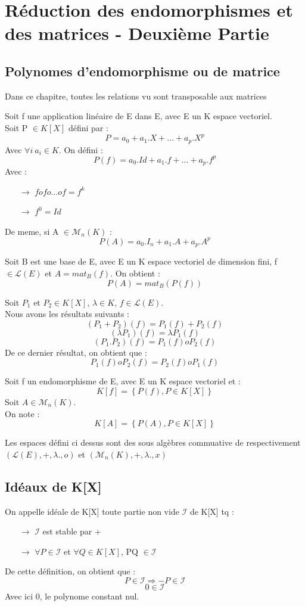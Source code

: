 \chapter{Réduction des endomorphismes et des matrices - Deuxième Partie}
\section{Polynomes d'endomorphisme ou de matrice}
Dans ce chapitre, toutes les relations vu sont transposable aux matrices
\begin{de}
Soit f une application linéaire de E dans E, avec E un K espace vectoriel.\\
Soit P $\in K[X]$ défini par : 
$$P = a_0 + a_1.X+\dots+a_p.X^p$$
Avec $\forall i~ a_i \in K$. On défini :
$$P(f) = a_0.Id + a_1.f +\dots+a_p.f^p$$
Avec : 
\begin{itemize}
 \item[$\rightarrow$] $fofo\dots of = f^k$
 \item[$\rightarrow$] $f^0 = Id$
\end{itemize}
De meme, si A $\in \mathcal{M}_n(K)$ : 
$$P(A) = a_0.I_n + a_1.A + a_p.A^p$$
\end{de}
\begin{prop}
Soit B est une base de E, avec E un K espace vectoriel de dimension fini, f$\in \mathcal{L}(E)$ et $A = mat_B(f)$. On obtient : 
$$P(A) = mat_B(P(f))$$
\end{prop}
\begin{prop}
Soit $P_1$ et $P_2 \in K[X]$, $\lambda \in K$, $f\in \mathcal{L}(E)$.\\
Nous avons les résultats suivants :
$$(P_1+P_2)(f) = P_1(f)+P_2(f)$$
$$(\lambda P_1)(f) = \lambda P_1(f)$$
$$(P_1.P_2)(f) = P_1(f) o P_2(f)$$
De ce dernier résultat, on obtient que : 
$$P_1(f)oP_2(f) = P_2(f)oP_1(f)$$
\end{prop}
\begin{de}
Soit f un endomorphisme de E, avec E un K espace vectoriel et :
$$K[f] = \left\lbrace P(f), P\in K[X] \right\rbrace $$
Soit $A \in \mathcal{M}_n(K)$.\\
On note : 
$$K[A] = \left\lbrace P(A), P \in K[X] \right\rbrace $$
\end{de}
\begin{prop}
Les espaces défini ci dessus sont des sous algèbres commuative de respectivement $(\mathcal{L}(E),+,\lambda.,o)$ et $(\mathcal{M}_n(K),+,\lambda.,x)$
\end{prop}
\section{Idéaux de K[X]}
\begin{de}
On appelle idéale de K[X] toute partie non vide $\mathcal{I}$ de K[X] tq : 
\begin{itemize}
 \item[$\rightarrow$] $\mathcal{I}$ est stable par +
 \item[$\rightarrow$] $\forall P \in \mathcal{I}$ et $\forall Q \in K[X]$, PQ $\in \mathcal{I}$
\end{itemize}
De cette définition, on obtient que : 
$$P \in \mathcal{I} \Rightarrow -P \in \mathcal{I}$$
$$0 \in \mathcal{I}$$
Avec ici 0, le polynome constant nul.
\end{de}
